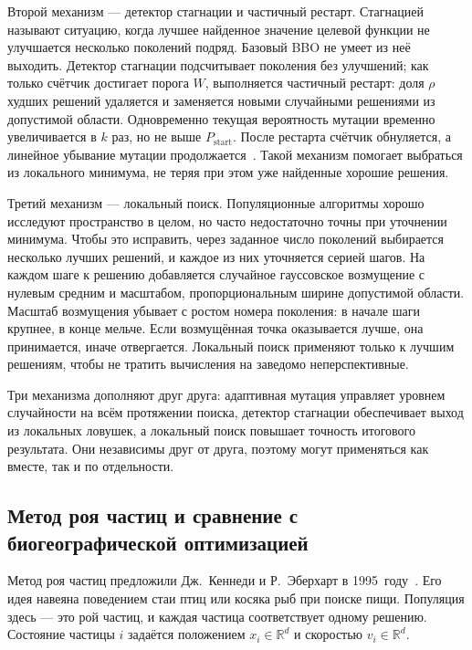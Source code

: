 \documentclass[14pt, a4paper]{extarticle}
\begin{document}
Второй механизм --- детектор стагнации и частичный рестарт. Стагнацией называют
ситуацию, когда лучшее найденное значение целевой функции не улучшается несколько
поколений подряд. Базовый BBO не умеет из неё выходить. Детектор стагнации
подсчитывает поколения без улучшений; как только счётчик достигает порога $W$,
выполняется частичный рестарт: доля $\rho$ худших решений удаляется и заменяется
новыми случайными решениями из допустимой области. Одновременно текущая
вероятность мутации временно увеличивается в $k$ раз, но не выше
$P_{\text{start}}$. После рестарта счётчик обнуляется, а линейное убывание мутации
продолжается~\cite{rodzin2019}. Такой механизм помогает выбраться из локального
минимума, не теряя при этом уже найденные хорошие решения.

Третий механизм --- локальный поиск. Популяционные алгоритмы хорошо исследуют
пространство в целом, но часто недостаточно точны при уточнении минимума. Чтобы
это исправить, через заданное число поколений выбирается несколько лучших
решений, и каждое из них уточняется серией шагов. На каждом шаге к решению
добавляется случайное гауссовское возмущение с нулевым средним и масштабом,
пропорциональным ширине допустимой области. Масштаб возмущения убывает с ростом
номера поколения: в начале шаги крупнее, в конце мельче. Если возмущённая точка
оказывается лучше, она принимается, иначе отвергается. Локальный поиск применяют
только к лучшим решениям, чтобы не тратить вычисления на заведомо
неперспективные.

Три механизма дополняют друг друга: адаптивная мутация управляет уровнем
случайности на всём протяжении поиска, детектор стагнации обеспечивает выход из
локальных ловушек, а локальный поиск повышает точность итогового результата.
Они независимы друг от друга, поэтому могут применяться как вместе, так и
по отдельности.

\subsection{Метод роя частиц и сравнение с биогеографической оптимизацией}
\label{subsec:pso}

Метод роя частиц предложили Дж.~Кеннеди и Р.~Эберхарт в 1995~году~\cite{kennedy1995}.
Его идея навеяна поведением стаи птиц или косяка рыб при поиске пищи. Популяция
здесь --- это рой частиц, и каждая частица соответствует одному решению. Состояние
частицы $i$ задаётся положением $x_i \in \mathbb{R}^d$ и скоростью
$v_i \in \mathbb{R}^d$.
\end{document}

